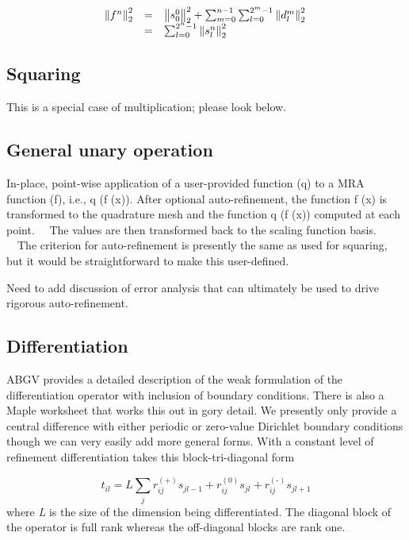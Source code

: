 \documentclass[letterpaper]{book}
\begin{document}
\begin{equation}
\begin{matrix}\hfill \left\|f^{n}\right\|_{2}^{2}&\text{=}&\left\|s_{0}^{0}\right\|_{2}^{2}+\sum _{m=0}^{n-1}\sum
_{l=0}^{2^{m}-1}\left\|d_{l}^{m}\right\|_{2}^{2}\hfill\null \\&\text{=}&\sum
_{l=0}^{2^{n}-1}\left\|s_{l}^{n}\right\|_{2}^{2}\hfill\null \end{matrix}
\end{equation}
\subsection[Squaring]{\rmfamily Squaring}
This is a special case of multiplication; please look below.

\subsection[General unary operation]{\rmfamily General unary operation}
In-place, point-wise application of a user-provided function (q) to a MRA function (f), i.e., q (f (x)). After optional
auto-refinement, the function f (x) is transformed to the quadrature mesh and the function q (f (x)) computed at each
point. \ \ The values are then transformed back to the scaling function basis. \ \ The criterion for auto-refinement is
presently the same as used for squaring, but it would be straightforward to make this user-defined.

Need to add discussion of error analysis that can ultimately be used to drive rigorous auto-refinement.

\subsection{Differentiation}
ABGV provides a detailed description of the weak formulation of the differentiation operator with inclusion of boundary
conditions. There is also a Maple worksheet that works this out in gory detail. We presently only provide a central
difference with either periodic or zero-value Dirichlet boundary conditions though we can very easily add more general
forms. With a constant level of refinement differentiation takes this block-tri-diagonal form 

\begin{equation}
t_{il}=L\sum _{j}{r_{ij}^{(\text{+})}s_{jl-1}+r_{ij}^{(0)}s_{jl}+r_{ij}^{(\text{{}-})}s_{jl+1}}
\end{equation}
where \textit{L} is the size of the dimension being differentiated. The diagonal block of the operator is full rank
whereas the off-diagonal blocks are rank one.
\end{document}
